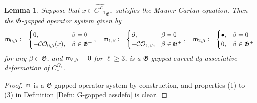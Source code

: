 \documentclass[10pt]{amsart}
\numberwithin{equation}{section}
\theoremstyle{plain}
\newtheorem{lemma}[theorem]{Lemma}
\theoremstyle{definition}
\theoremstyle{remark}
\numberwithin{equation}{section}
\newcommand{\wh}[1]{\widehat{#1}}
\newcommand{\mf}[1]{\mathfrak{#1}}
\newcommand{\CO}{\mathcal{CO}}
\newcommand{\CBa}{C_*^{\Omega_\star}}
\newcommand{\Cfr}[1]{C_{#1}^\mathscr{L}}
\newcommand{\mm}{\textup{\textsf{m}}}
\begin{document}
{\begin{lemma}\label{Lm: MC Ainfty}
	Suppose that $x\in \wh{\Cfr{-1}}_{\mathfrak{G}^+}$ satisfies the Maurer-Cartan equation. 
	Then the $\mf{G}$-gapped operator system given by \[ \mm_{0,\beta}:= \begin{cases}
			0, & \beta = 0 \\
			-\CO_{0,\beta}(x), & \beta \in \mf{G}^+
		\end{cases},
		\quad \mm_{1,\beta}:= \begin{cases}
			\partial, & \beta =0\\
			-\CO_{1,\beta}, & \beta \in \mf{G}^+
		\end{cases}, \quad \mm_{2,\beta}:= \begin{cases}
			\bullet, & \beta = 0\\
			0, & \beta \in \mf{G}^+
		\end{cases}  \]
		for any $\beta\in \mf{G}$,
		and $\mm_{\ell,\beta}=0$ for $\ell \geq 3$, is a $\mf{G}$-gapped curved dg associative deformation of $\CBa$.
\end{lemma}

\begin{proof}
	$\mm$ is a $\mf{G}$-gapped operator system by construction, and properties (1) to (3) in Definition \ref{Defn: G-gapped assdefo} is clear.


\end{proof}}
\end{document}
